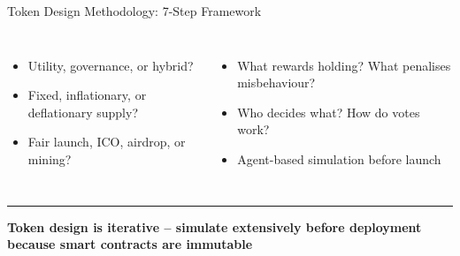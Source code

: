 \documentclass[8pt,aspectratio=169]{beamer}
\newcommand{\bottomnote}[1]{\vfill\vspace{-2mm}\textcolor{mllavender2}{\rule{\textwidth}{0.4pt}}\vspace{1mm}\footnotesize\textbf{#1}}
\begin{document}
\begin{frame}{Token Design Methodology: 7-Step Framework}
\begin{columns}[T]
\begin{itemize}
  \item[\textbf{2.}] Utility, governance, or hybrid?
  \item[\textbf{3.}] Fixed, inflationary, or deflationary supply?
  \item[\textbf{4.}] Fair launch, ICO, airdrop, or mining?
\end{itemize}
\begin{itemize}
  \item[\textbf{5.}] What rewards holding? What penalises misbehaviour?
  \item[\textbf{6.}] Who decides what? How do votes work?
  \item[\textbf{7.}] Agent-based simulation before launch
\end{itemize}
\end{columns}
\bottomnote{Token design is iterative -- simulate extensively before deployment because smart contracts are immutable}
\end{frame}
\end{document}
